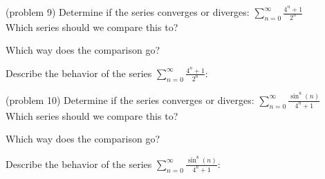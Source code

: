 \documentclass[handout]{ximera}
\begin{document}
\begin{problem}(problem 9)
Determine if the series converges or diverges: $\displaystyle{\sum_{n=0}^\infty \frac{4^n + 1}{2^n}}$\\
Which series should we compare this to?

\begin{multipleChoice}
\end{multipleChoice}

Which way does the comparison go?
\begin{multipleChoice}
\end{multipleChoice}

Describe the behavior of the series $\sum_{n=0}^\infty \frac{4^n + 1}{2^n}:$
\begin{multipleChoice}
\end{multipleChoice}

\end{problem}




\begin{problem}(problem 10)
Determine if the series converges or diverges: $\displaystyle{\sum_{n=0}^\infty \frac{\sin^8(n)}{4^n + 1}}$\\
Which series should we compare this to?

\begin{multipleChoice}
\end{multipleChoice}

Which way does the comparison go?
\begin{multipleChoice}
\end{multipleChoice}

Describe the behavior of the series $\sum_{n=0}^\infty \frac{\sin^8(n)}{4^n + 1}:$
\begin{multipleChoice}
\end{multipleChoice}

\end{problem}
\end{document}
